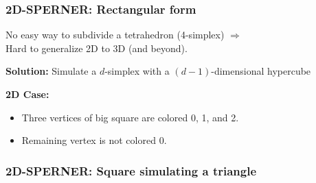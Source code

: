 \documentclass[10pt]{beamer}
\begin{document}
\begin{frame}
\frametitle{2D-SPERNER: Rectangular form}

No easy way to subdivide a tetrahedron (4-simplex) $\Rightarrow$\\
Hard to generalize 2D to 3D (and beyond).
\vspace{\baselineskip}

\textbf{Solution:} Simulate a $d$-simplex with a $(d-1)$-dimensional hypercube
\vspace{\baselineskip}

\textbf{2D Case:}
\begin{itemize}
\item Three vertices of big square are colored 0, 1, and 2.
\item Remaining vertex is not colored 0.
\end{itemize}
\vspace{\baselineskip}

\begin{figure}[hbt]
  
  \centerline{\box\graph}
\end{figure}


\end{frame}
\begin{frame}
\frametitle{2D-SPERNER: Square simulating a triangle}

\begin{figure}[hbt]
  
  \centerline{\box\graph}
\end{figure}


\end{frame}
\end{document}
